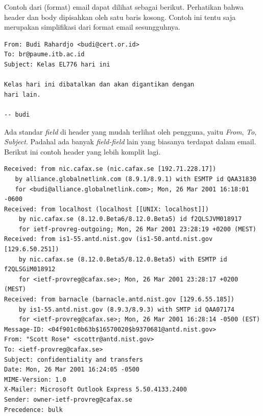 Contoh dari (format) email dapat dilihat sebagai berikut. Perhatikan bahwa
header dan body dipisahkan oleh satu baris kosong. Contoh ini tentu saja
merupakan simplifikasi dari format email sesungguhnya.

\begin{mdframed}
\begin{verbatim}
From: Budi Rahardjo <budi@cert.or.id>
To: br@paume.itb.ac.id
Subject: Kelas EL776 hari ini

Kelas hari ini dibatalkan dan akan digantikan dengan
hari lain.

-- budi
\end{verbatim}
\end{mdframed}

Ada standar {\em field} di header yang mudah terlihat oleh pengguna, yaitu {\em
From}, {\em To}, {\em Subject}. Padahal ada banyak {\em field-field} lain yang
biasanya terdapat dalam email. Berikut ini contoh header yang lebih komplit
lagi.

\begin{mdframed}
\begin{verbatim}
Received: from nic.cafax.se (nic.cafax.se [192.71.228.17])
   by alliance.globalnetlink.com (8.9.1/8.9.1) with ESMTP id QAA31830
   for <budi@alliance.globalnetlink.com>; Mon, 26 Mar 2001 16:18:01 -0600
Received: from localhost (localhost [[UNIX: localhost]])
	by nic.cafax.se (8.12.0.Beta6/8.12.0.Beta5) id f2QLSJVM018917
	for ietf-provreg-outgoing; Mon, 26 Mar 2001 23:28:19 +0200 (MEST)
Received: from is1-55.antd.nist.gov (is1-50.antd.nist.gov [129.6.50.251])
	by nic.cafax.se (8.12.0.Beta5/8.12.0.Beta5) with ESMTP id f2QLSGiM018912
	for <ietf-provreg@cafax.se>; Mon, 26 Mar 2001 23:28:17 +0200 (MEST)
Received: from barnacle (barnacle.antd.nist.gov [129.6.55.185])
	by is1-55.antd.nist.gov (8.9.3/8.9.3) with SMTP id QAA07174
	for <ietf-provreg@cafax.se>; Mon, 26 Mar 2001 16:28:14 -0500 (EST)
Message-ID: <04f901c0b63b$16570020$b9370681@antd.nist.gov>
From: "Scott Rose" <scottr@antd.nist.gov>
To: <ietf-provreg@cafax.se>
Subject: confidentiality and transfers
Date: Mon, 26 Mar 2001 16:24:05 -0500
MIME-Version: 1.0
X-Mailer: Microsoft Outlook Express 5.50.4133.2400
Sender: owner-ietf-provreg@cafax.se
Precedence: bulk
\end{verbatim}
\end{mdframed}
